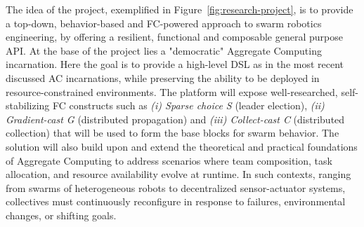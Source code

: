 \documentclass[12pt]{article}
\begin{document}





The idea of the project, exemplified in Figure~\ref{fig:research-project}, is to provide a top-down, behavior-based and FC-powered approach to swarm robotics engineering, by offering a
resilient, functional and composable general purpose API.
At the base of the project lies a "democratic" Aggregate Computing incarnation. Here the goal is to provide a high-level DSL as in the most recent discussed AC incarnations,
while preserving the ability to be deployed in resource-constrained environments. The platform will expose well-researched, self-stabilizing FC constructs such as
\textit{(i) Sparse choice S} (leader election), \textit{(ii) Gradient-cast G} (distributed propagation) and \textit{(iii) Collect-cast C} (distributed collection) that will be used to form
the base blocks for swarm behavior. The solution will also build upon and extend the theoretical and practical foundations of Aggregate Computing to address scenarios where team composition, 
task allocation, and resource availability evolve at runtime. In such contexts, ranging from swarms of heterogeneous robots to decentralized sensor-actuator 
systems, collectives must continuously reconfigure in response to failures, environmental changes, or shifting goals.
\end{document}
